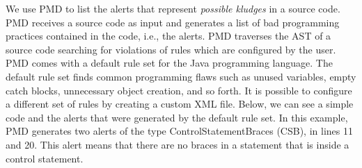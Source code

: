 \documentclass[
]{article}
\begin{document}
We use PMD to list the alerts that represent \textit{possible kludges}
in a source code. PMD receives a source code as input and generates a
list of bad programming practices contained in the code, i.e., the
alerts. %
%
PMD traverses the AST of a source code searching for violations of rules
which are configured by the user. PMD comes with a default rule set for
the Java programming language. The default rule set finds common
programming flaws such as unused variables, empty catch blocks,
unnecessary object creation, and so forth. It is possible to configure a
different set of rules by creating a custom XML file. Below, we can see
a simple code and the alerts that were generated by the default rule set. 
In this example, PMD generates two alerts of the type ControlStatementBraces
(CSB), in lines 11 and 20. This alert means that there are no braces in
a statement that is inside a control statement.

\small

\normalsize

\newpage

\small
\end{document}
